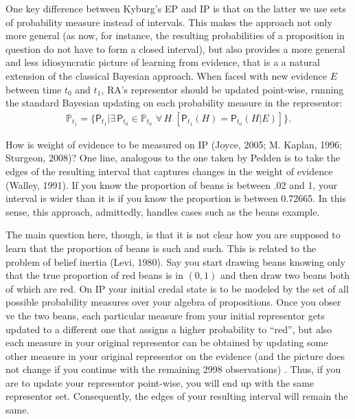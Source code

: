\documentclass[
  10pt,
  dvipsnames,enabledeprecatedfontcommands]{scrartcl}
\begin{document}
One key difference between Kyburg's \textsf{EP} and \textsf{IP} is that
on the latter we use sets of probability measure instead of intervals.
This makes the approach not only more general (as now, for instance, the
resulting probabilities of a proposition in question do not have to form
a closed interval), but also provides a more general and less
idiosyncratic picture of learning from evidence, that is a a natural
extension of the classical Bayesian approach. When faced with new
evidence \(E\) between time \(t_0\) and \(t_1\), RA's representor should
be updated point-wise, running the standard Bayesian updating on each
probability measure in the representor:
\begin{align*} \label{eq:updateRepresentor}
\mathbb{P}_{t_1} = \{\mathsf{P}_{t_1}\vert \exists\, {\mathsf{P}_{t_0} \!\in  \mathbb{P}_{t_0}}\,\, \forall\, {H}\,\, \left[\mathsf{P}_{t_1}(H)=\mathsf{P}_{t_0}(H \vert E)\right] \}.
\end{align*}

How is weight of evidence to be measured on \textsf{IP} (Joyce, 2005; M.
Kaplan, 1996; Sturgeon, 2008)? One line, analogous to the one taken by
Pedden is to take the edges of the resulting interval that captures
changes in the weight of evidence (Walley, 1991). If you know the
proportion of beans is between .02 and 1, your interval is wider than it
is if you know the proportion is between 0.72665. In this sense, this
approach, admittedly, handles cases such as the beans example.

The main question here, though, is that it is not clear how you are
supposed to learn that the proportion of beans is such and such. This is
related to the problem of belief inertia (Levi, 1980). Say you start
drawing beans knowing only that the true proportion of red beans is in
\((0,1)\) and then draw two beans both of which are red. On \textsf{IP}
your initial credal state is to be modeled by the set of all possible
probability measures over your algebra of propositions. Once you obser
ve the two beans, each particular measure from your initial representor
gets updated to a different one that assigns a higher probability to
``red'', but also each measure in your original representor can be
obtained by updating some other measure in your original representor on
the evidence (and the picture does not change if you continue with the
remaining 2998 observations) . Thus, if you are to update your
representor point-wise, you will end up with the same representor set.
Consequently, the edges of your resulting interval will remain the same.
\end{document}

